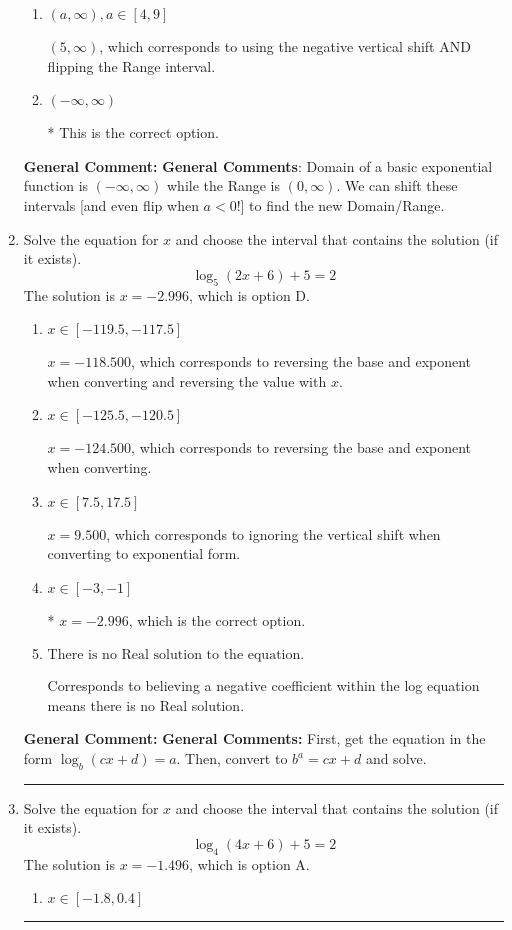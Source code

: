 \documentclass{extbook}[14pt]
\newcommand{\litem}[1]{\item #1

\rule{\textwidth}{0.4pt}}
\begin{document}
\begin{enumerate}
{\begin{enumerate}[label=\Alph*.]
$(-\infty, -5]$, which corresponds to using the correct vertical shift *if we wanted the Range* AND including the endpoint.
\item \( (a, \infty), a \in [4, 9] \)

$(5, \infty)$, which corresponds to using the negative vertical shift AND flipping the Range interval.
\item \( (-\infty, \infty) \)

* This is the correct option.
\end{enumerate}

\textbf{General Comment:} \textbf{General Comments}: Domain of a basic exponential function is $(-\infty, \infty)$ while the Range is $(0, \infty)$. We can shift these intervals [and even flip when $a<0$!] to find the new Domain/Range.
}
\litem{
Solve the equation for $x$ and choose the interval that contains the solution (if it exists).
\[ \log_{5}{(2x+6)}+5 = 2 \]The solution is \( x = -2.996 \), which is option D.\begin{enumerate}[label=\Alph*.]
\item \( x \in [-119.5, -117.5] \)

$x = -118.500$, which corresponds to reversing the base and exponent when converting and reversing the value with $x$.
\item \( x \in [-125.5, -120.5] \)

$x = -124.500$, which corresponds to reversing the base and exponent when converting.
\item \( x \in [7.5, 17.5] \)

$x = 9.500$, which corresponds to ignoring the vertical shift when converting to exponential form.
\item \( x \in [-3, -1] \)

* $x = -2.996$, which is the correct option.
\item \( \text{There is no Real solution to the equation.} \)

Corresponds to believing a negative coefficient within the log equation means there is no Real solution.
\end{enumerate}

\textbf{General Comment:} \textbf{General Comments:} First, get the equation in the form $\log_b{(cx+d)} = a$. Then, convert to $b^a = cx+d$ and solve.
}
\litem{
Solve the equation for $x$ and choose the interval that contains the solution (if it exists).
\[ \log_{4}{(4x+6)}+5 = 2 \]The solution is \( x = -1.496 \), which is option A.\begin{enumerate}[label=\Alph*.]
\item \( x \in [-1.8, 0.4] \)


\end{enumerate}}
\end{enumerate}
\end{document}
